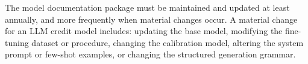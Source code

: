 \begin{context}
The model documentation package must be maintained and updated at least annually, and more frequently when material changes occur. A material change for an LLM credit model includes: updating the base model, modifying the fine-tuning dataset or procedure, changing the calibration model, altering the system prompt or few-shot examples, or changing the structured generation grammar.

\end{context}

